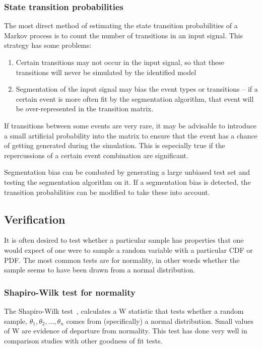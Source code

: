 \subsubsection{State transition probabilities}
The most direct method of estimating the state transition probabilities of a Markov process is to count the number of transitions in an input signal.
This strategy has some problems:
\begin{enumerate}
\item Certain transitions may not occur in the input signal, so that these transitions will never be simulated by the identified model
\item Segmentation of the input signal may bias the event types or transitions -- if a certain event is more often fit by the segmentation algorithm, that event will be over-represented in the transition matrix.
\end{enumerate}

If transitions between some events are very rare, it may be advisable to introduce a small artificial probability into the matrix to ensure that the event has a chance of  getting generated during the simulation.
This is especially true if the repercussions of a certain event combination are significant.  

Segmentation bias can be combated by generating a large unbiased test set and testing the segmentation algorithm on it.
If a segmentation bias is detected, the transition probabilities can be modified to take these into account.

\subsection{Verification}
It is often desired to test whether a particular sample has properties that one would expect of one were to sample a random variable with a particular CDF or PDF.
The most common tests are for normality, in other words whether the sample seems to have been drawn from a normal distribution.

\subsubsection{Shapiro-Wilk test for normality}\label{sec:shapiro-wilk-test}
The Shapiro-Wilk test~\citep{shapiro.wilk1965analysis}, calculates a W statistic that tests whether a random sample, $\theta_1, \theta_2, \dots, \theta_n$ comes from (specifically) a normal distribution.  
Small values of W are evidence of departure from normality.  
This test has done very well in comparison studies with other goodness of fit tests.

